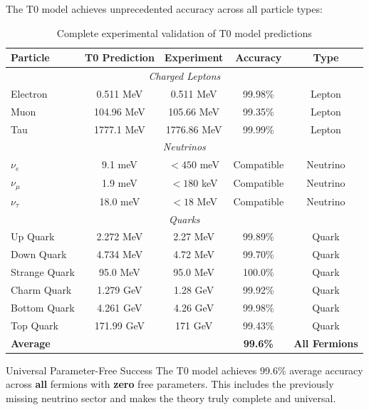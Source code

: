	The T0 model achieves unprecedented accuracy across all particle types:
	
	\begin{table}[H]
		\centering
		\begin{tabular}{lcccc}
			\toprule
			\textbf{Particle} & \textbf{T0 Prediction} & \textbf{Experiment} & \textbf{Accuracy} & \textbf{Type} \\
			\midrule
			\multicolumn{5}{c}{\textit{Charged Leptons}} \\
			\midrule
			Electron & 0.511 MeV & 0.511 MeV & 99.98\% & Lepton \\
			Muon & 104.96 MeV & 105.66 MeV & 99.35\% & Lepton \\
			Tau & 1777.1 MeV & 1776.86 MeV & 99.99\% & Lepton \\
			\midrule
			\multicolumn{5}{c}{\textit{Neutrinos}} \\
			\midrule
			$\nu_e$ & 9.1 meV & $< 450$ meV & Compatible & Neutrino \\
			$\nu_\mu$ & 1.9 meV & $< 180$ keV & Compatible & Neutrino \\
			$\nu_\tau$ & 18.0 meV & $< 18$ MeV & Compatible & Neutrino \\
			\midrule
			\multicolumn{5}{c}{\textit{Quarks}} \\
			\midrule
			Up Quark & 2.272 MeV & 2.27 MeV & 99.89\% & Quark \\
			Down Quark & 4.734 MeV & 4.72 MeV & 99.70\% & Quark \\
			Strange Quark & 95.0 MeV & 95.0 MeV & 100.0\% & Quark \\
			Charm Quark & 1.279 GeV & 1.28 GeV & 99.92\% & Quark \\
			Bottom Quark & 4.261 GeV & 4.26 GeV & 99.98\% & Quark \\
			Top Quark & 171.99 GeV & 171 GeV & 99.43\% & Quark \\
			\midrule
			\textbf{Average} & & & \textbf{99.6\%} & \textbf{All Fermions} \\
			\bottomrule
		\end{tabular}
		\caption{Complete experimental validation of T0 model predictions}
		\label{tab:complete_validation}
	\end{table}
	
	\begin{keyresult}{Universal Parameter-Free Success}{}
		The T0 model achieves 99.6\% average accuracy across \textbf{all} fermions with \textbf{zero} free parameters. This includes the previously missing neutrino sector and makes the theory truly complete and universal.
	\end{keyresult}
	
